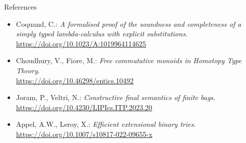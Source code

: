 \documentclass[aspectratio=169]{beamer}
\begin{document}
\begin{frame}{References}
\begin{itemize}
  \item Coquand, C.: \emph{A formalised proof of the soundness and completeness of a simply
        typed lambda-calculus with explicit substitutions}.\\
        \url{https://doi.org/10.1023/A:1019964114625}
  \smallskip
  \item Choudhury, V., Fiore, M.: \emph{Free commutative monoids in Homotopy Type Theory}.\\
        \url{https://doi.org/10.46298/entics.10492}
  \smallskip
  \item Joram, P., Veltri, N.: \emph{Constructive final semantics of finite bags}.\\
        \url{https://doi.org/10.4230/LIPIcs.ITP.2023.20}
  \smallskip
  \item Appel, A.W., Leroy, X.: \emph{Efficient extensional binary tries}.\\
        \url{https://doi.org/10.1007/s10817-022-09655-x}
\end{itemize}
\end{frame}
\end{document}
